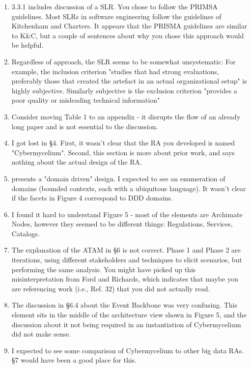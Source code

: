 \documentclass[review]{elsarticle}
\begin{document}
\begin{enumerate}

    \item 3.3.1 includes discussion of a SLR. You chose to follow the PRIMSA guidelines. Most SLRs in software engineering follow the guidelines of Kitchenham and Charters. It appears that the PRISMA guidelines are similar to K\&C, but a couple of sentences about why you chose this approach would be helpful.
    \item Regardless of approach, the SLR seems to be somewhat unsystematic: For example, the inclusion criterion "studies that had strong evaluations, preferably those that created the artefact in an actual organizational setup" is highly subjective. Similarly subjective is the exclusion criterion "provides a poor quality or misleading technical information"


    \item Consider moving Table 1 to an appendix - it disrupts the flow of an already long paper and is not essential to the discussion.
 
    \item I got lost in §4. First, it wasn't clear that the RA you developed is named "Cybermycelium". Second, this section is more about prior work, and says nothing about the actual design of the RA.
    \item presents a "domain driven" design. I expected to see an enumeration of domains (bounded contexts, each with a ubiquitous language). It wasn't clear if the facets in Figure 4 correspond to DDD domains.
    \item I found it hard to understand Figure 5 - most of the elements are Archimate Nodes, however they seemed to be different things: Regulations, Services, Catalogs.
    \item The explanation of the ATAM in §6 is not correct. Phase 1 and Phase 2 are iterations, using different stakeholders and techniques to elicit scenarios, but performing the same analysis. You might have picked up this misinterpretation from Ford and Richards, which indicates that maybe you are referencing work (i.e., Ref. 32) that you did not actually read.
    \item The discussion in §6.4 about the Event Backbone was very confusing. This element sits in the middle of the architecture view shown in Figure 5, and the discussion about it not being required in an instantiation of Cybermycelium did not make sense.
    \item I expected to see some comparison of Cybermycelium to other big data RAs. §7 would have been a good place for this.
 

\end{enumerate}
\end{document}
